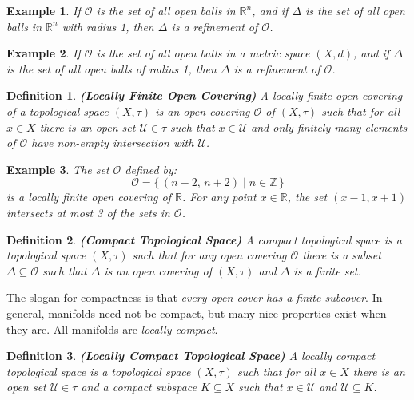 \documentclass{article}
\theoremstyle{plain}
\theoremstyle{normal}
\newtheorem{definition}{Definition}[section]
\newtheorem{example}{Example}[section]
\begin{document}
        \begin{example}
            If $\mathcal{O}$ is the set of all open balls in $\mathbb{R}^{n}$,
            and if $\Delta$ is the set of all open balls in $\mathbb{R}^{n}$
            with radius 1, then $\Delta$ is a refinement of $\mathcal{O}$.
        \end{example}
        \begin{example}
            If $\mathcal{O}$ is the set of all open balls in a metric space
            $(X,d)$, and if $\Delta$ is the set of all open balls of radius 1,
            then $\Delta$ is a refinement of $\mathcal{O}$.
        \end{example}
        \begin{definition}{\textbf{(Locally Finite Open Covering)}}
            A locally finite open covering of a topological space $(X,\tau)$
            is an open covering $\mathcal{O}$ of $(X,\tau)$ such that for all
            $x\in{X}$ there is an open set $\mathcal{U}\in\tau$ such
            that $x\in\mathcal{U}$ and only finitely many elements of
            $\mathcal{O}$ have non-empty intersection with $\mathcal{U}$.
        \end{definition}
        \begin{example}
            The set $\mathcal{O}$ defined by:
            \begin{equation}
                \mathcal{O}=\{\,(n-2,\,n+2)\;|\;n\in\mathbb{Z}\,\}
            \end{equation}
            is a locally finite open covering of $\mathbb{R}$. For any point
            $x\in\mathbb{R}$, the set $(x-1,x+1)$ intersects at most 3 of the
            sets in $\mathcal{O}$.
        \end{example}
        \begin{definition}{\textbf{(Compact Topological Space)}}
            A compact topological space is a topological space $(X,\tau)$
            such that for any open covering $\mathcal{O}$ there is a subset
            $\Delta\subseteq\mathcal{O}$ such that $\Delta$ is an open covering
            of $(X,\tau)$ and $\Delta$ is a finite set.
        \end{definition}
        The slogan for compactness is that
        \textit{every open cover has a finite subcover}. In general, manifolds
        need not be compact, but many nice properties exist when they are.
        All manifolds are \textit{locally compact}.
        \begin{definition}{\textbf{(Locally Compact Topological Space)}}
            A locally compact topological space is a topological space
            $(X,\tau)$ such that for all $x\in{X}$ there is an open set
            $\mathcal{U}\in\tau$ and a compact subspace $K\subseteq{X}$ such
            that $x\in\mathcal{U}$ and $\mathcal{U}\subseteq{K}$.
        \end{definition}
\end{document}

